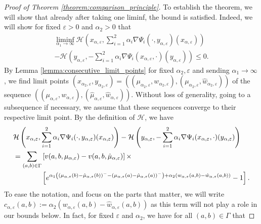 \documentclass[a4paper]{article}
\newcommand{\cH}{\mathcal{H}}
\numberwithin{equation}{section}
\theoremstyle{definition}
\begin{document}
\begin{proof}[Proof of Theorem \ref{theorem:comparison_principle}]
	To establish the theorem, we will show that already after taking one liminf, the bound is satisfied. Indeed, we will show for fixed $\varepsilon > 0$ and $\alpha_2 > 0$ that
	\begin{multline}
		\liminf_{\alpha_1 \rightarrow \infty} \cH\left(x_{\alpha,\varepsilon},\sum_{i=1}^2 \alpha_i \nabla \Psi_i(\cdot,y_{\alpha,\varepsilon})(x_{\alpha,\varepsilon})\right) \\
		- \cH\left(y_{\alpha,\varepsilon},- \sum_{i=1}^2 \alpha_i \nabla \Psi_i(x_{\alpha,\varepsilon},\cdot)(y_{\alpha,\varepsilon})\right) \leq 0. \label{eqn:to_prove_fundamental_bound}
	\end{multline}
	By Lemma \ref{lemma:consecutive_limit_points} for fixed $\alpha_2, \varepsilon$ and sending $\alpha_1 \rightarrow \infty$, we find limit points $(x_{\alpha_2,\varepsilon},y_{\alpha_2,\varepsilon}) = ((\mu_{\alpha_2,\varepsilon}, w_{\alpha_2,\varepsilon}),(\mu_{\alpha_2,\varepsilon},\hat{w}_{\alpha_2,\varepsilon}))$ of the sequence $((\mu_{\alpha,\varepsilon},w_{\alpha,\varepsilon}),(\hat{\mu}_{\alpha,\varepsilon},\hat{w}_{\alpha,\varepsilon}))$. Without loss of generality, going to a subsequence if necessary, we assume that these sequences converge to their respective limit point. By the definition of $\cH$, we have
	\begin{align}
		& \cH\left(x_{\alpha,\varepsilon},\sum_{i=1}^2 \alpha_i \nabla \Psi_i(\cdot,y_{\alpha,\varepsilon})(x_{\alpha,\varepsilon})\right) - \cH\left(y_{\alpha,\varepsilon},- \sum_{i=1}^2 \alpha_i \nabla \Psi_i(x_{\alpha,\varepsilon},\cdot)(y_{\alpha,\varepsilon})\right) \notag \\
		& = \sum_{(a,b) \in \Gamma} \left[v(a,b,\mu_{\alpha,\varepsilon}) - v(a,b,\hat{\mu}_{\alpha,\varepsilon}) \right] \times \label{eqn:proof_comparison_Potts_sum} \\
		& \hspace{4em} \left[e^{\alpha_1\left(\left(\mu_{\alpha,\varepsilon}(b) - \hat{\mu}_{\alpha,\varepsilon}(b)\right)^- - \left(\mu_{\alpha,\varepsilon}(a) - \hat{\mu}_{\alpha,\varepsilon}(a)\right)^-\right) + \alpha_2\left(w_{\alpha,\varepsilon}(a,b) - \hat{w}_{\alpha,\varepsilon}(a,b)\right)} - 1\right]. \notag 
	\end{align}
	To ease the notation, and focus on the parts that matter, we will write $c_{\alpha,\varepsilon}(a,b) := \alpha_2\left(w_{\alpha,\varepsilon}(a,b) - \hat{w}_{\alpha,\varepsilon}(a,b)\right)$ as this term will not play a role in our bounds below. In fact, for fixed $\varepsilon$ and $\alpha_2$, we have for all $(a,b) \in \Gamma$ that

\end{proof}
\end{document}
